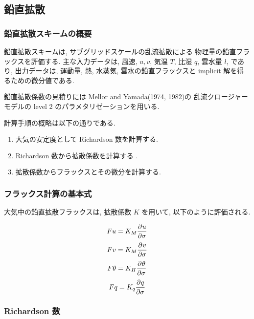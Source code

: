 ﻿
\subsection{鉛直拡散}

\subsubsection{鉛直拡散スキームの概要}

鉛直拡散スキームは,
サブグリッドスケールの乱流拡散による
物理量の鉛直フラックスを評価する.
主な入力データは, 風速, $u, v$, 気温 $T$, 比湿 $q$, 雲水量 $l$, であり,
出力データは, 運動量, 熱, 水蒸気, 雲水の鉛直フラックスと
implicit 解を得るための微分値である.

鉛直拡散係数の見積りには
Mellor and Yamada(1974, 1982)の
乱流クロージャーモデルの
level 2 のパラメタリゼーションを用いる.

計算手順の概略は以下の通りである.
\begin{enumerate}
\item 大気の安定度として
      Richardson 数を計算する.
\item Richardson 数から拡散係数を計算する .
\item 拡散係数からフラックスとその微分を計算する.
\end{enumerate}

\subsubsection{フラックス計算の基本式}

大気中の鉛直拡散フラックスは, 
拡散係数 $K$ を用いて, 以下のように評価される.

\begin{equation}
  F{u} = K_{M} \DP{u}{\sigma} 
\end{equation}
\begin{equation}
  F{v} = K_M \DP{v}{\sigma} 
\end{equation}
\begin{equation}
  F{\theta} = K_H \DP{\theta}{\sigma} 
\end{equation}
\begin{equation}
  F{q} = K_q \DP{q}{\sigma} 
\end{equation}

\subsubsection{Richardson 数}

